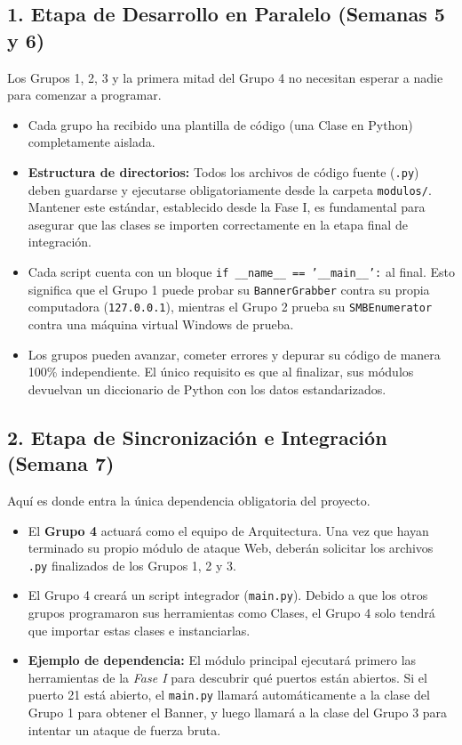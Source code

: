 \documentclass[12pt,letterpaper]{article}
\begin{document}
\subsection*{1. Etapa de Desarrollo en Paralelo (Semanas 5 y 6)}
Los Grupos 1, 2, 3 y la primera mitad del Grupo 4 no necesitan esperar a nadie para comenzar a programar.
\begin{itemize}
    \item Cada grupo ha recibido una plantilla de código (una Clase en Python) completamente aislada.
    \item \textbf{Estructura de directorios:} Todos los archivos de código fuente (\texttt{.py}) deben guardarse y ejecutarse obligatoriamente desde la carpeta \texttt{modulos/}. Mantener este estándar, establecido desde la Fase I, es fundamental para asegurar que las clases se importen correctamente en la etapa final de integración.
    \item Cada script cuenta con un bloque \texttt{if \_\_name\_\_ == '\_\_main\_\_':} al final. Esto significa que el Grupo 1 puede probar su \texttt{BannerGrabber} contra su propia computadora (\texttt{127.0.0.1}), mientras el Grupo 2 prueba su \texttt{SMBEnumerator} contra una máquina virtual Windows de prueba.
    \item Los grupos pueden avanzar, cometer errores y depurar su código de manera 100\% independiente. El único requisito es que al finalizar, sus módulos devuelvan un diccionario de Python con los datos estandarizados.
\end{itemize}

\subsection*{2. Etapa de Sincronización e Integración (Semana 7)}
Aquí es donde entra la única dependencia obligatoria del proyecto. 

\begin{itemize}
    \item El \textbf{Grupo 4} actuará como el equipo de Arquitectura. Una vez que hayan terminado su propio módulo de ataque Web, deberán solicitar los archivos \texttt{.py} finalizados de los Grupos 1, 2 y 3.
    \item El Grupo 4 creará un script integrador (\texttt{main.py}). Debido a que los otros grupos programaron sus herramientas como Clases, el Grupo 4 solo tendrá que importar estas clases e instanciarlas.
    \item \textbf{Ejemplo de dependencia:} El módulo principal ejecutará primero las herramientas de la \textit{Fase I} para descubrir qué puertos están abiertos. Si el puerto 21 está abierto, el \texttt{main.py} llamará automáticamente a la clase del Grupo 1 para obtener el Banner, y luego llamará a la clase del Grupo 3 para intentar un ataque de fuerza bruta. 
\end{itemize}
\end{document}

